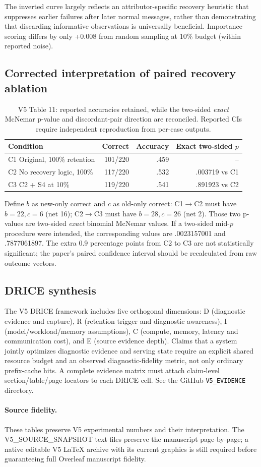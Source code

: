 The inverted curve largely reflects an attributor-specific recovery
heuristic that suppresses earlier failures after later normal messages,
rather than demonstrating that discarding informative observations is
universally beneficial. Importance scoring differs by only +0.008
from random sampling at 10\% budget (within reported noise).

\subsection{Corrected interpretation of paired recovery ablation}
\begin{table}[ht]\centering\footnotesize
\caption{V5 Table 11: reported accuracies retained, while the
two-sided \emph{exact} McNemar p-value and discordant-pair direction
are reconciled. Reported CIs require independent reproduction from
per-case outputs.}
\label{tab:v5recover}
\begin{tabular}{lrrr}\toprule
Condition & Correct & Accuracy & Exact two-sided $p$\\\midrule
C1 Original, 100\% retention & 101/220 & .459 & --\\
C2 No recovery logic, 100\% & 117/220 & .532 & .003719 vs C1\\
C3 C2 + S4 at 10\% & 119/220 & .541 & .891923 vs C2\\
\bottomrule\end{tabular}\end{table}
Define $b$ as new-only correct and $c$ as old-only correct:
C1$\to$C2 must have $b=22,c=6$ (net 16);
C2$\to$C3 must have $b=28,c=26$ (net 2).
Those two p-values are two-sided \emph{exact} binomial McNemar values.
If a two-sided mid-$p$ procedure were intended, the corresponding
values are .0023157001 and .7877061897. The extra 0.9 percentage points
from C2 to C3 are not statistically significant; the paper's paired
confidence interval should be recalculated from raw outcome vectors.

\subsection{DRICE synthesis}
The V5 DRICE framework includes five orthogonal dimensions:
D (diagnostic evidence and capture), R (retention trigger and diagnostic
awareness), I (model/workload/memory assumptions), C (compute, memory,
latency and communication cost), and E (source evidence depth).
Claims that a system jointly optimizes diagnostic evidence and serving
state require an explicit shared resource budget and an observed
diagnostic-fidelity metric, not only ordinary prefix-cache hits.
A complete evidence matrix must attach claim-level section/table/page
locators to each DRICE cell. See the GitHub \texttt{V5\_EVIDENCE} directory.

\paragraph*{Source fidelity.} These tables preserve V5 experimental
numbers and their interpretation. The V5_SOURCE_SNAPSHOT text files
preserve the manuscript page-by-page; a native editable V5 LaTeX
archive with its current graphics is still required before guaranteeing
full Overleaf manuscript fidelity.
